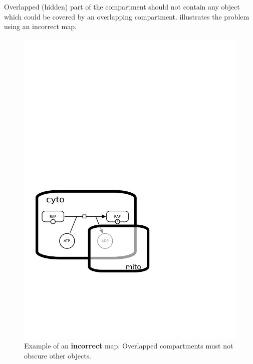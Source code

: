 Overlapped (hidden) part of the compartment should not contain any object which could be covered by an overlapping compartment.   illustrates the problem using an incorrect map.

\begin{figure}[H]
  \centering
  \includegraphics[scale = 0.45]{examples/compartment_overlapping_wrong}
  \caption{Example of an \textbf{incorrect} map.  Overlapped compartments must not obscure other objects.}
  \label{fig:overlap-bad}
\end{figure}


